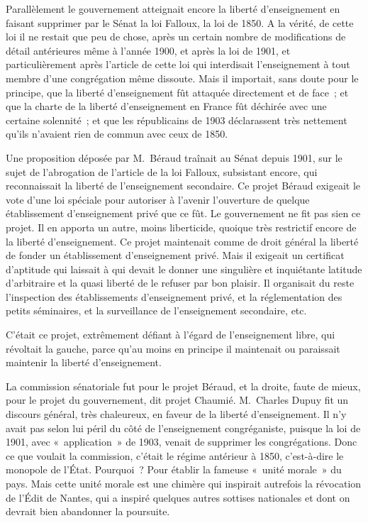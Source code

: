 \documentclass[french,twoside]{book} %
\begin{document}
\noindent Parallèlement le gouvernement atteignait encore la liberté d’enseignement en faisant supprimer par le Sénat la loi Falloux, la loi de 1850. A la vérité, de cette loi il ne restait que peu de chose, après un certain nombre de modifications de détail antérieures même à l’année 1900, et après la loi de 1901, et particulièrement après l’article de cette loi qui  interdisait l’enseignement à tout membre d’une congrégation même dissoute. Mais il importait, sans doute pour le principe, que la liberté d’enseignement fût attaquée directement et de face ; et que la charte de la liberté d’enseignement en France fût déchirée avec une certaine solennité ; et que les républicains de 1903 déclarassent très nettement qu’ils n’avaient rien de commun avec ceux de 1850.\par
Une proposition déposée par M. Béraud traînait au Sénat depuis 1901, sur le sujet de l’abrogation de l’article de la loi Falloux, subsistant encore, qui reconnaissait la liberté de l’enseignement secondaire. Ce projet Béraud exigeait le vote d’une loi spéciale pour autoriser à l’avenir l’ouverture de quelque établissement d’enseignement privé que ce fût. Le gouvernement ne fit pas sien ce projet. Il en apporta un autre, moins liberticide, quoique très restrictif encore de la liberté d’enseignement. Ce projet maintenait comme de droit général la liberté de fonder un établissement d’enseignement privé. Mais il exigeait un certificat d’aptitude qui laissait à qui devait le donner une singulière et inquiétante latitude d’arbitraire et la quasi liberté de le refuser par bon plaisir. Il organisait du reste l’inspection des établissements d’enseignement privé, et la réglementation des petits  séminaires, et la surveillance de l’enseignement secondaire, etc.\par
C’était ce projet, extrêmement défiant à l’égard de l’enseignement libre, qui révoltait la gauche, parce qu’au moins en principe il maintenait ou paraissait maintenir la liberté d’enseignement.\par
La commission sénatoriale fut pour le projet Béraud, et la droite, faute de mieux, pour le projet du gouvernement, dit projet Chaumié. M. Charles Dupuy fit un discours général, très chaleureux, en faveur de la liberté d’enseignement. Il n’y avait pas selon lui péril du côté de l’enseignement congréganiste, puisque la loi de 1901, avec « application » de 1903, venait de supprimer les congrégations. Donc ce que voulait la commission, c’était le régime antérieur à 1850, c’est-à-dire le monopole de l’État. Pourquoi ? Pour établir la fameuse « unité morale » du pays. Mais cette unité morale est une chimère qui inspirait autrefois la révocation de l’Édit de Nantes, qui a inspiré quelques autres sottises nationales et dont on devrait bien abandonner la poursuite.\par
\end{document}
